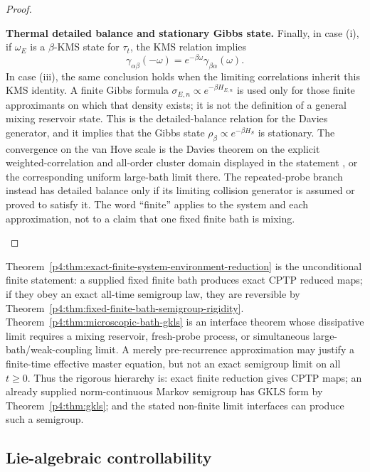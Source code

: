 \documentclass[12pt,a4paper]{article}
\begin{document}
\begin{proof}
\begin{proofsteps}
\item \textbf{Thermal detailed balance and stationary Gibbs state.}
Finally, in case (i), if \(\omega_E\) is a \(\beta\)-KMS state for
\(\tau_t\), the KMS relation implies
\[
\gamma_{\alpha\beta}(-\omega)=e^{-\beta\omega}\gamma_{\beta\alpha}(\omega).
\]
In case (iii), the same conclusion holds when the limiting correlations
inherit this KMS identity.  A finite Gibbs formula
\(\sigma_{E,n}\propto e^{-\beta H_{E,n}}\) is used only for those finite
approximants on which that density exists; it is not the definition of a
general mixing reservoir state.
This is the detailed-balance relation for the Davies generator, and it implies that the Gibbs state
\(
\rho_\beta\propto e^{-\beta H_S}
\)
is stationary.
The convergence on the van Hove scale is the Davies theorem on the explicit
weighted-correlation and all-order cluster domain displayed in the statement
\cite{Davies1974,Davies1976,BreuerPetruccione2002}, or the corresponding
uniform large-bath limit there.  The repeated-probe branch
instead has detailed balance only if its limiting collision generator is
assumed or proved to satisfy it.  The word
``finite'' applies to the system and each approximation, not to a claim that
one fixed finite bath is mixing.
\end{proofsteps}

\end{proof}

\begin{remark}
\label{p4:rem:microbath-status}
Theorem~\ref{p4:thm:exact-finite-system-environment-reduction} is the
unconditional finite statement: a supplied fixed finite bath produces exact
CPTP reduced maps; if they obey an exact all-time semigroup law, they are
reversible by
Theorem~\ref{p4:thm:fixed-finite-bath-semigroup-rigidity}.
Theorem~\ref{p4:thm:microscopic-bath-gkls} is an
interface theorem whose dissipative limit requires a mixing reservoir,
fresh-probe process, or simultaneous large-bath/weak-coupling limit.
A merely pre-recurrence approximation may justify a finite-time effective
master equation, but not an exact semigroup limit on all \(t\ge0\).
Thus the rigorous hierarchy is: exact finite reduction gives CPTP maps;
an already supplied norm-continuous Markov semigroup has GKLS form by
Theorem~\ref{p4:thm:gkls}; and the stated non-finite limit interfaces can
produce such a semigroup.
\end{remark}



\subsection{Lie-algebraic controllability}
\label{p4:sec:part3-controllability}
\end{document}
